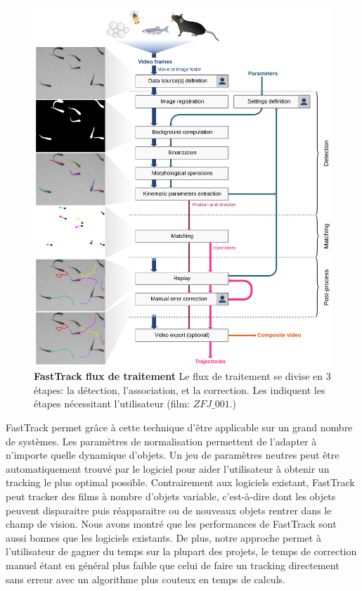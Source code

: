     \begin{figure}[h!]
      \centering
      \includegraphics[width=1\textwidth]{part_1/assets/Figure_1.png}
        \caption{{\bf FastTrack flux de traitement} Le flux de traitement se divise en 3 étapes: la détection, l'association, et la correction. Les \faUser indiquent les étapes nécessitant l'utilisateur (film: $ZFJ\_001$.)}
      \label{}
    \end{figure}

FastTrack permet grâce à cette technique d'être applicable sur un grand nombre de systèmes. Les paramètres de normalisation permettent de l'adapter à n'importe quelle dynamique d'objets. Un jeu de paramètres neutres peut être automatiquement trouvé par le logiciel pour aider l'utilisateur à obtenir un tracking le plus optimal possible. Contrairement aux logiciels existant, FastTrack peut tracker des films à nombre d'objets variable, c’est-à-dire dont les objets peuvent disparaitre puis réapparaitre ou de nouveaux objets rentrer dans le champ de vision. Nous avons montré que les performances de FastTrack sont aussi bonnes que les logiciels existants. De plus, notre approche permet à l'utilisateur de gagner du temps sur la plupart des projets, le temps de correction manuel étant en général plus faible que celui de faire un tracking directement sans erreur avec un algorithme plus couteux en temps de calculs.

